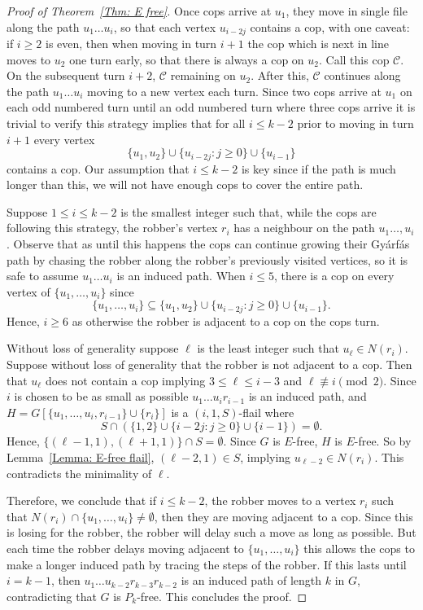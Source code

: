 \documentclass[12pt]{article}
\theoremstyle{definition}
\def\E{\textit{E}}
\begin{document}
\begin{proof}[Proof of Theorem~\ref{Thm: E free}]
Once cops arrive at $u_1$,
they move in single file 
along the path $u_1\dots u_i$, so that each vertex $u_{i-2j}$ contains a cop,
with one caveat: 
if $i\geq 2$ is even, then when moving in turn $i+1$ the cop which is next in line moves to $u_2$ one turn early, so that there is always a cop on $u_2$. 
Call this cop $\mathcal{C}$.
On the subsequent turn $i+2$, $\mathcal{C}$ remaining on $u_2$.
After this, $\mathcal{C}$ continues along the path $u_1\dots u_i$ moving to a new vertex each turn.
Since two cops arrive at $u_1$ on each odd numbered turn until an odd numbered turn where three cops arrive 
it is trivial to verify this strategy implies that
for all $i \leq k-2$  prior to moving in turn $i+1$ every vertex
\[
\{u_1,u_2\} \cup \{u_{i-2j}: j\geq 0\} \cup \{u_{i-1}\}
\]
contains a cop.
Our assumption that $i\leq k-2$ is key since if the path is much longer than this, we will not have enough cops to cover the entire path.

Suppose $1 \leq i \leq k-2$ is the smallest integer such that, while the cops are following this strategy,
the robber's vertex $r_i$ has a neighbour
on the path $u_1\dots, u_{i}$.
Observe that as until this happens the cops can continue growing their Gy\'arf\'as path by chasing the robber along the robber's previously visited vertices,
so it is safe to assume $u_1 \dots u_i$ is an induced path.
When $i \leq 5$, there is a cop on every vertex of $\{u_1,\dots, u_i\}$ since 
\[
\{u_1,\dots, u_i\}\subseteq \{u_1,u_2\} \cup \{u_{i-2j}: j\geq 0\} \cup \{u_{i-1}\}.
\]
Hence,  $i\geq 6$ as otherwise the robber is adjacent to a cop on the cops turn.


Without loss of generality suppose $\ell$ is the least integer such that $u_\ell \in N(r_i)$.
Suppose without loss of generality that the robber is not adjacent to a cop.
Then that $u_{\ell}$ does not contain a cop 
implying $3 \leq \ell \leq i-3$ and $\ell \not\equiv i \pmod{2}$.
Since $i$ is chosen to be as small as possible
$u_1\dots u_{i}r_{i-1}$ is an induced path,
and 
$H = G[\{u_1,\dots, u_{i},r_{i-1}\} \cup \{r_i\}]$ is a $(i,1,S)$-flail
where 
\[
S \cap \left(\{1,2\} \cup \{ i -2j: j\geq 0\} \cup \{i-1\} \right) = \emptyset.
\]
Hence, $\{(\ell-1,1),(\ell+1,1)\}\cap S = \emptyset$.
Since $G$ is $\E$-free, $H$ is $\E$-free.
So by Lemma~\ref{Lemma: E-free flail}, $(\ell-2,1)\in S$, implying $u_{\ell-2}\in N(r_i)$.
This contradicts the minimality of $\ell$.


Therefore, 
we conclude that if $i\leq k-2$,
the robber moves to a vertex $r_i$ such that $N(r_i) \cap \{u_1,\dots, u_i\} \neq \emptyset$,
then they are moving adjacent to a cop.
Since this is losing for the robber, the robber will delay such a move as long as possible.
But each time the robber delays moving adjacent to $\{u_1,\dots, u_i\}$
this allows the cops to make a longer induced path by tracing the steps of the robber.
If this lasts until $i=k-1$,
then $u_1\dots u_{k-2}r_{k-3} r_{k-2}$ is an induced path of length $k$ in $G$,
contradicting that $G$ is $P_k$-free.
This concludes the proof.
\end{proof}
\end{document}
